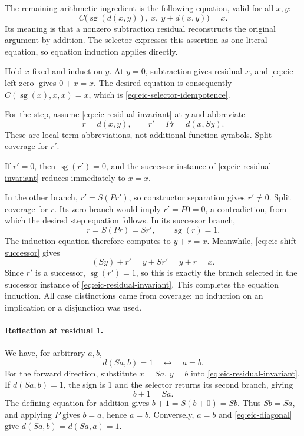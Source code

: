 \documentclass[11pt,letterpaper]{article}
\theoremstyle{definition}\newtheorem{definition}[theorem]{Definition}
\theoremstyle{remark}\newtheorem{remark}[theorem]{Remark}
\begin{document}
The remaining arithmetic ingredient is the following equation, valid for
all $x,y$:
\begin{equation}
 C\bigl(\operatorname{sg}(d(x,y)),\ x,\ y+d(x,y)\bigr)=x.
 \label{eq:eic-residual-invariant}
\end{equation}
Its meaning is that a nonzero subtraction residual reconstructs the
original argument by addition.  The selector expresses this assertion as
one literal equation, so equation induction applies directly.

Hold $x$ fixed and induct on $y$.  At $y=0$, subtraction gives residual
$x$, and \eqref{eq:eic-left-zero} gives $0+x=x$.  The desired equation
is consequently $C(\operatorname{sg}(x),x,x)=x$, which is
\eqref{eq:eic-selector-idempotence}.

For the step, assume \eqref{eq:eic-residual-invariant} at $y$ and
abbreviate
\[
 r=d(x,y),\qquad r'=Pr=d(x,Sy).
\]
These are local term abbreviations, not additional function symbols.
Split coverage for $r'$.

If $r'=0$, then $\operatorname{sg}(r')=0$, and the successor instance
of \eqref{eq:eic-residual-invariant} reduces immediately to $x=x$.

In the other branch, $r'=S(Pr')$, so constructor separation gives
$r'\ne0$.  Split coverage for $r$.  Its zero branch would imply
$r'=P0=0$, a contradiction, from which the desired step equation follows.
In its successor branch,
\[
 r=S(Pr)=Sr',\qquad \operatorname{sg}(r)=1.
\]
The induction equation therefore computes to $y+r=x$.  Meanwhile,
\eqref{eq:eic-shift-successor} gives
\[
 (Sy)+r'=y+Sr'=y+r=x.
\]
Since $r'$ is a successor, $\operatorname{sg}(r')=1$, so this is
exactly the branch selected in the successor instance of
\eqref{eq:eic-residual-invariant}.  This completes the equation induction.
All case distinctions came from coverage; no induction on an implication
or a disjunction was used.

\paragraph{Reflection at residual $1$.}
We have, for arbitrary $a,b$,
\begin{equation}
 d(Sa,b)=1\quad\longleftrightarrow\quad a=b.
 \label{eq:eic-residual-reflection}
\end{equation}
For the forward direction, substitute $x=Sa$, $y=b$ into
\eqref{eq:eic-residual-invariant}.  If $d(Sa,b)=1$, the sign is $1$
and the selector returns its second branch, giving
\[
 b+1=Sa.
\]
The defining equation for addition gives $b+1=S(b+0)=Sb$.  Thus
$Sb=Sa$, and applying $P$ gives $b=a$, hence $a=b$.
Conversely, $a=b$ and \eqref{eq:eic-diagonal} give
$d(Sa,b)=d(Sa,a)=1$.
\end{document}
